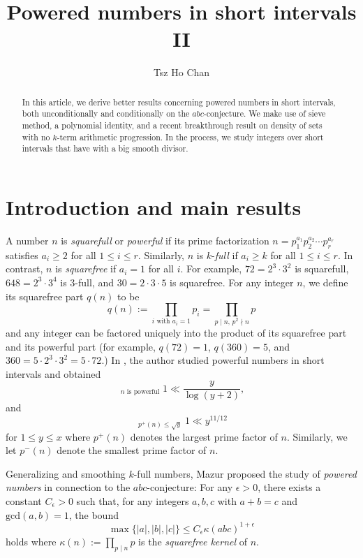 \documentclass[12pt]{article}
\title{Powered numbers in short intervals II}
\author{Tsz Ho Chan}
\date{}
\begin{document}
\maketitle

\begin{abstract}
In this article, we derive better results concerning powered numbers in short intervals, both unconditionally and conditionally on the $abc$-conjecture. We make use of sieve method, a polynomial identity, and a recent breakthrough result on density of sets with no $k$-term arithmetic progression. In the process, we study integers over short intervals that have with a big smooth divisor.
\end{abstract}

\section{Introduction and main results}

A number $n$ is {\it squarefull} or {\it powerful} if its prime factorization $n = p_1^{a_1} p_2^{a_2} \cdots p_r^{a_r}$ satisfies $a_i \ge 2$ for all $1 \le i \le r$. Similarly, $n$ is $k$-{\it full} if $a_i \ge k$ for all $1 \le i \le r$. In contrast, $n$ is {\it squarefree} if $a_i = 1$ for all $i$. For example, $72 = 2^3 \cdot 3^2$ is squarefull, $648 = 2^3 \cdot 3^4$ is $3$-full, and $30 = 2 \cdot 3 \cdot 5$ is squarefree. For any integer $n$, we define its squarefree part $q(n)$ to be
\[
q(n) := \prod_{i \text{ with } a_i = 1} p_i = \prod_{p \mid n, \, p^2 \nmid n} p
\]
and any integer can be factored uniquely into the product of its squarefree part and its powerful part (for example, $q(72) = 1$, $q(360) = 5$, and $360 = 5 \cdot 2^3 \cdot 3^2 = 5 \cdot 72$.) In \cite{C:2023}, the author studied powerful numbers in short intervals and obtained
\[
\mathop{\sum_{x < n \le x + y}}_{n \text{ is powerful}} 1 \ll \frac{y}{\log (y +2)},
\]
and
\begin{equation} \label{smooth}
\mathop{\mathop{\sum_{x < n \le x + y}}_{n \text{ is powerful}}}_{p^{+}(n) \le \sqrt{y} } 1 \ll y^{11/12}
\end{equation}
for $1 \le y \le x$ where $p^{+}(n)$ denotes the largest prime factor of $n$. Similarly, we let $p^{-}(n)$ denote the smallest prime factor of $n$.

\bigskip

Generalizing and smoothing $k$-full numbers, Mazur \cite{M:2000} proposed the study of {\it powered numbers} in connection to the $abc$-conjecture: For any $\epsilon > 0$, there exists a constant $C_\epsilon > 0$ such that, for any integers $a, b, c$ with $a + b = c$ and $\text{gcd}(a,b) = 1$, the bound
\[
\max\{ |a|, |b|, |c| \} \le C_\epsilon \kappa(a b c)^{1 + \epsilon}
\]
holds where $\kappa(n) := \prod_{p \mid n} p$ is the {\it squarefree kernel} of $n$. 
\end{document}

